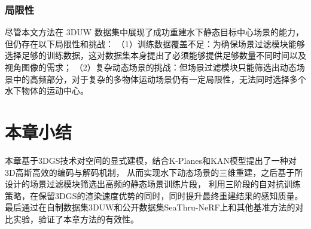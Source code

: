 \subsubsection{局限性}
尽管本文方法在 3DUW 数据集中展现了成功重建水下静态目标中心场景的能力，但仍存在以下局限性和挑战：
（1）训练数据覆盖不足：为确保场景过滤模块能够选择足够的训练数据，这对数据集本身提出了必须能够提供足够数量不同时间以及视角图像的需求；
（2）复杂动态场景的挑战：但场景过滤模块只能筛选出动态场景中的高频部分，对于复杂的多物体运动场景仍有一定局限性，无法同时选择多个水下物体的运动中心。

\section{本章小结}
本章基于3DGS技术对空间的显式建模，结合K-Planes和KAN模型提出了一种对3D高斯高效的编码与解码机制，
从而实现水下动态场景的三维重建，之后基于所设计的场景过滤模块筛选出高频的静态场景训练片段，
利用三阶段的自对抗训练策略，在保留3DGS的渲染速度优势的同时，同时提升最终重建结果的感知质量。
最后通过在自制数据集3DUW和公开数据集SeaThru-NeRF上和其他基准方法的对比实验，验证了本章方法的有效性。


